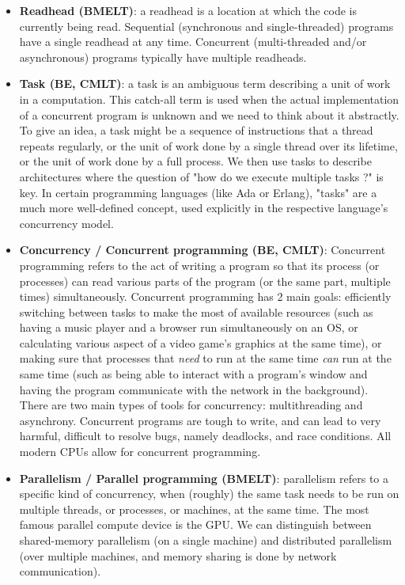 \documentclass{article}
\begin{document}
\begin{itemize}
	\item \textbf{Readhead (BMELT)}: a readhead is a location at which the code is currently being read. Sequential (synchronous and single-threaded) programs have a single readhead at any time. Concurrent (multi-threaded and/or asynchronous) programs typically have multiple readheads.

	\item \textbf{Task (BE, CMLT)}: a task is an ambiguous term describing a unit of work in a computation. This catch-all term is used when the actual implementation of a concurrent program is unknown and we need to think about it abstractly. To give an idea, a task might be a sequence of instructions that a thread repeats regularly, or the unit of work done by a single thread over its lifetime, or the unit of work done by a full process. We then use tasks to describe architectures where the question of "how do we execute multiple tasks ?" is key. In certain programming languages (like Ada or Erlang), "tasks" are a much more well-defined concept, used explicitly in the respective language's concurrency model.

	\item \textbf{Concurrency / Concurrent programming (BE, CMLT)}: Concurrent programming refers to the act of writing a program so that its process (or processes) can read various parts of the program (or the same part, multiple times) simultaneously. Concurrent programming has 2 main goals: efficiently switching between tasks to make the most of available resources (such as having a music player and a browser run simultaneously on an OS, or calculating various aspect of a video game's graphics at the same time), or making sure that processes that \textit{need} to run at the same time \textit{can} run at the same time (such as being able to interact with a program's window and having the program communicate with the network in the background). There are two main types of tools for concurrency: multithreading and asynchrony. Concurrent programs are tough to write, and can lead to very harmful, difficult to resolve bugs, namely deadlocks, and race conditions. All modern CPUs allow for concurrent programming.

	\item \textbf{Parallelism / Parallel programming (BMELT)}: parallelism refers to a specific kind of concurrency, when (roughly) the same task needs to be run on multiple threads, or processes, or machines, at the same time. The most famous parallel compute device is the GPU. We can distinguish between shared-memory parallelism (on a single machine) and distributed parallelism (over multiple machines, and memory sharing is done by network communication).


\end{itemize}
\end{document}
